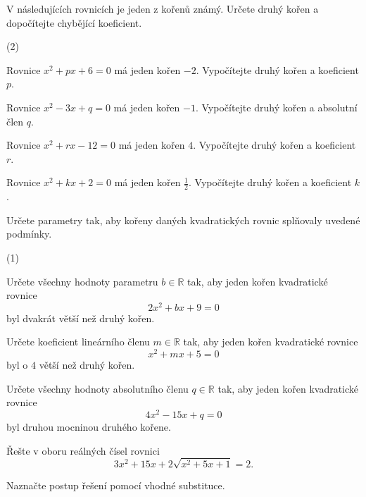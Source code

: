 \documentclass[12pt,a4paper]{article}
\begin{document}
\begin{exercise}
V následujících rovnicích je jeden z kořenů známý. Určete druhý kořen a dopočítejte chybějící koeficient.

\begin{tasks}(2)

  \task Rovnice \(x^2 + px + 6 = 0\) má jeden kořen \(-2\).  
        Vypočítejte druhý kořen a koeficient \(p\).

  \task Rovnice \(x^2 - 3x + q = 0\) má jeden kořen \(-1\).  
        Vypočítejte druhý kořen a absolutní člen \(q\).

  \task Rovnice \(x^2 + rx - 12 = 0\) má jeden kořen \(4\).  
        Vypočítejte druhý kořen a koeficient \(r\).

  \task Rovnice \(x^2 + kx + 2 = 0\) má jeden kořen \(\tfrac{1}{2}\).  
        Vypočítejte druhý kořen a koeficient \(k\).

\end{tasks}

\end{exercise}


\begin{exercise}
Určete parametry tak, aby kořeny daných kvadratických rovnic splňovaly uvedené podmínky.

\begin{tasks}(1)

  \task Určete všechny hodnoty parametru \(b \in \mathbb{R}\) tak, aby jeden kořen kvadratické rovnice
  \[
  2x^2 + bx + 9 = 0
  \]
  byl dvakrát větší než druhý kořen.

  \task Určete koeficient lineárního členu \(m \in \mathbb{R}\) tak, aby jeden kořen kvadratické rovnice
  \[
  x^2 + mx + 5 = 0
  \]
  byl o \(4\) větší než druhý kořen.

  \task Určete všechny hodnoty absolutního členu \(q \in \mathbb{R}\) tak, aby jeden kořen kvadratické rovnice
  \[
  4x^2 - 15x + q = 0
  \]
  byl druhou mocninou druhého kořene.

\end{tasks}

\end{exercise}


\begin{exercise}
Řešte v oboru reálných čísel rovnici
\[
3x^2 + 15x + 2\sqrt{x^2 + 5x + 1} = 2.
\]

Naznačte postup řešení pomocí vhodné substituce.

\end{exercise}
\end{document}
